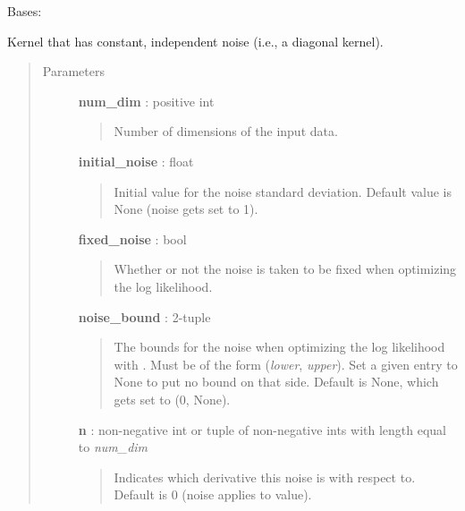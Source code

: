 \documentclass[letterpaper,10pt,english]{sphinxmanual}
\begin{document}
\begin{fulllineitems}
\label{gptools.kernel:gptools.kernel.noise.DiagonalNoiseKernel}
Bases: {\hyperref[gptools.kernel:gptools.kernel.core.Kernel]{}}

Kernel that has constant, independent noise (i.e., a diagonal kernel).
\begin{quote}\begin{description}
\item[{Parameters }] \leavevmode
\textbf{num\_dim} : positive int
\begin{quote}

Number of dimensions of the input data.
\end{quote}

\textbf{initial\_noise} : float
\begin{quote}

Initial value for the noise standard deviation. Default value is None
(noise gets set to 1).
\end{quote}

\textbf{fixed\_noise} : bool
\begin{quote}

Whether or not the noise is taken to be fixed when optimizing the log
likelihood.
\end{quote}

\textbf{noise\_bound} : 2-tuple
\begin{quote}

The bounds for the noise when optimizing the log likelihood with
. Must be of the form
(\emph{lower}, \emph{upper}). Set a given entry to None to put no bound on
that side. Default is None, which gets set to (0, None).
\end{quote}

\textbf{n} : non-negative int or tuple of non-negative ints with length equal to \emph{num\_dim}
\begin{quote}

Indicates which derivative this noise is with respect to. Default is 0
(noise applies to value).
\end{quote}

\end{description}\end{quote}


\end{fulllineitems}
\end{document}
